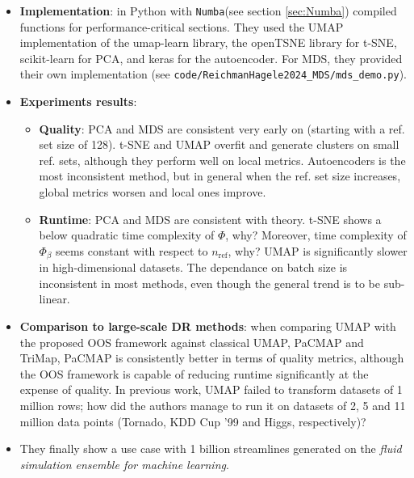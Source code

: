 \documentclass[a4paper,12pt]{article}
\begin{document}
\begin{itemize}
    \item \textbf{Implementation}: in Python with \texttt{Numba}(see section \ref{sec:Numba}) compiled functions for performance-critical sections. They used the UMAP implementation of the umap-learn library, the openTSNE library for t-SNE, scikit-learn for PCA, and keras for the autoencoder. For MDS, they provided their own implementation (see \verb$code/ReichmanHagele2024_MDS/mds_demo.py$).
    \item \textbf{Experiments results}:
    \begin{itemize}
        \item \textbf{Quality}: PCA and MDS are consistent very early on (starting with a ref. set size of 128). t-SNE and UMAP overfit and generate clusters on small ref. sets, although they perform well on local metrics. Autoencoders is the most inconsistent method, but in general when the ref. set size increases, global metrics worsen and local ones improve.
        \item \textbf{Runtime}: PCA and MDS are consistent with theory. t-SNE shows a below quadratic time complexity of $\Phi$, why? Moreover, time complexity of $\Phi_{\beta}$ seems constant with respect to $n_{\mathrm{ref}}$, why? UMAP is significantly slower in high-dimensional datasets. The dependance on batch size is inconsistent in most methods, even though the general trend is to be sub-linear.
    \end{itemize}
    \item \textbf{Comparison to large-scale DR methods}: when comparing UMAP with the proposed OOS framework against classical UMAP, PaCMAP and TriMap, PaCMAP is consistently better in terms of quality metrics, although the OOS framework is capable of reducing runtime significantly at the expense of quality. In previous work, UMAP failed to transform datasets of 1 million rows; how did the authors manage to run it on datasets of 2, 5 and 11 million data points (Tornado, KDD Cup '99 and Higgs, respectively)?

    \item They finally show a use case with 1 billion streamlines generated on the \textit{fluid simulation ensemble for machine learning}.
    

\end{itemize}
\end{document}
